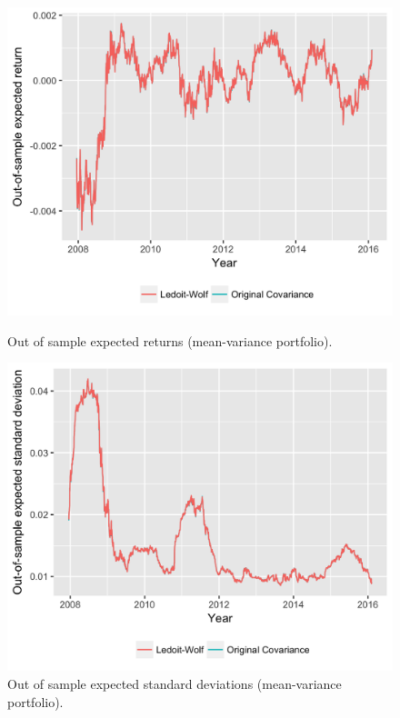 \documentclass[letterpaper,12pt]{article}
\begin{document}
\begin{figure}[!tbp]
  \centering
  \begin{minipage}[t]{0.45\textwidth}
    \includegraphics[width=\textwidth]{fig_mean_variance_ous_r.png}
    \caption{Out of sample expected returns (mean-variance portfolio).\label{fig:fig_mean_variance_ous_r}}
  \end{minipage}
  \hfill
  \begin{minipage}[t]{0.45\textwidth}
    \includegraphics[width=\textwidth]{fig_mean_variance_ous_std.png}
    \caption{Out of sample expected standard deviations (mean-variance portfolio).\label{fig:fig_mean_variance_ous_std}}
  \end{minipage}
\end{figure}
\end{document}
